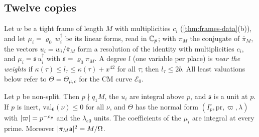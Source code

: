 \subsection{Twelve copies}\label{ss:twelve-copies}
Let $w$ be a tight frame of length $M$ with multiplicities $c_i$ (\cref{thm:frames-data}(b)), and let
$\mu_i=\varrho_0\,w_i^\dagger$ be its linear forms, read in $\mathbb{C}_p$; with $\pi_M$ the conjugate of $\bar\pi_M$,
the vectors $u_i=w_i/\bar\pi_M$ form a resolution of the identity with multiplicities $c_i$, and
$\mu_i=\mathfrak s\,u_i^\dagger$ with $\mathfrak s=\varrho_0\pi_M$. A degree $l$ (one variable per place) is
\emph{near the weights} if $\kappa(\tau)\le l_\tau\le\kappa(\tau)+x^{42}$ for all $\tau$; then $l_\tau\le2b$.
All least valuations below refer to $\Theta=\Theta_{\mu,c}$ for the CM curve $\mathcal E_0$.

\begin{lemma}\label{lem:frame-at-nonsplit}
Let $p$ be non-split. Then $p\nmid q_1M$, the $u_i$ are integral above $p$, and $\mathfrak s$ is a unit at
$p$. If $p$ is inert, $\mathrm{val}_6(\nu)\le0$ for all $\nu$, and $\Theta$ has the normal form
$(I_p^\circ,\mathrm{pr},\varpi,\lambda)$ with $\lvert \varpi\rvert=p^{-\rho_p}$ and the $\lambda_{e0}$ units. The
coefficients of the $\mu_i$ are integral at every prime. Moreover $\lvert \pi_M\mathsf a\rvert^2=M/\Omega$.
\end{lemma}

